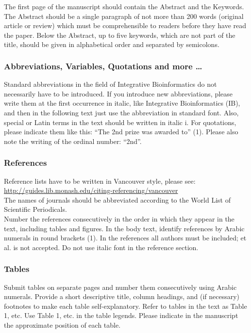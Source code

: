 \documentclass{jib}
\begin{document}
The first page of the manuscript should contain the Abstract and the Keywords.
The Abstract should be a single paragraph of not more than 200 words (original
article or review) which must be comprehensible to readers before they have read
the paper. Below the Abstract, up to five keywords, which are not part of the
title, should be given in alphabetical order and separated by semicolons.

\subsubsection{Abbreviations, Variables, Quotations and more \ldots}

Standard abbreviations in the field of Integrative Bioinformatics do not
necessarily have to be introduced. If you introduce new abbreviations, please
write them at the first occurrence in italic, like Integrative Bioinformatics
(IB), and then in the following text just use the abbreviation in standard font.
Also, special or Latin terms in the text should be written in italic i.
For quotations, please indicate them like this: ``The 2nd prize was awarded to''
(1). Please also note the writing of the ordinal number: ``2nd''.

\subsubsection{References}

Reference lists have to be written in Vancouver style, please see:
\\
\url{http://guides.lib.monash.edu/citing-referencing/vancouver} 
\\
The names of journals should be abbreviated according to the World List of
Scientific Periodicals.
\\
Number the references consecutively in the order in which they appear in the
text, including tables and figures. In the body text, identify references by
Arabic numerals in round brackets (1). In the references all authors must be
included; et al. is not accepted. Do not use italic font in the reference
section.

\subsubsection{Tables}

Submit tables on separate pages and number them consecutively using Arabic
numerals. Provide a short descriptive title, column headings, and (if necessary)
footnotes to make each table self-explanatory. Refer to tables in the text as
Table 1, etc. Use Table 1, etc. in the table legends. Please indicate in the
manuscript the approximate position of each table.
\end{document}
